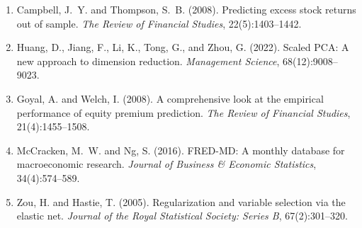 \documentclass{article}
\begin{document}
\begin{enumerate}
    \item Campbell, J.~Y. and Thompson, S.~B. (2008). Predicting excess stock returns out of sample. \emph{The Review of Financial Studies}, 22(5):1403--1442.

    \item Huang, D., Jiang, F., Li, K., Tong, G., and Zhou, G. (2022). Scaled PCA: A new approach to dimension reduction. \emph{Management Science}, 68(12):9008--9023.

    \item Goyal, A. and Welch, I. (2008). A comprehensive look at the empirical performance of equity premium prediction. \emph{The Review of Financial Studies}, 21(4):1455--1508.

    \item McCracken, M.~W. and Ng, S. (2016). FRED-MD: A monthly database for macroeconomic research. \emph{Journal of Business \& Economic Statistics}, 34(4):574--589.

    \item Zou, H. and Hastie, T. (2005). Regularization and variable selection via the elastic net. \emph{Journal of the Royal Statistical Society: Series B}, 67(2):301--320.
\end{enumerate}
\end{document}
